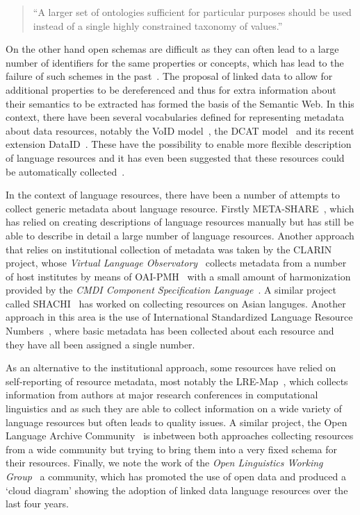 \documentclass[smallextended]{svjour3}       %
\begin{document}
\begin{quote}
``A larger set of ontologies sufficient for particular purposes should
be used instead of a single highly constrained taxonomy of values.''
\end{quote}

On the other hand open schemas are difficult
as they can often lead to a large number of identifiers for the same properties
or concepts, which has lead to the failure of such schemes in the
past~\cite{kemps2008isocat}. The proposal of linked data to allow for additional
properties to be dereferenced and thus for extra information about their
semantics to be extracted has formed the basis of the Semantic Web. In this
context, there have been several vocabularies defined for representing metadata
about data resources, notably the VoID model~\cite{alexander2011describing}, the
DCAT model~\cite{maali2014data} and its recent extension
DataID~\cite{brummer2014dataid}. These have the possibility to enable more
flexible description of language resources and it has even been suggested that
these resources could be automatically collected~\cite{jenkins1999automatic}.

In the context of language resources, there have been a number of attempts to
collect generic metadata about language resource. Firstly
META-SHARE~\cite{gavrilidou2012meta,piperidis2012meta}, which has relied on
creating descriptions of language resources manually but has still be able to
describe in detail a large number of language resources. Another approach that
relies on institutional collection of metadata was taken by the CLARIN project,
whose \emph{Virtual Language Observatory}~\cite{van2012semantic} collects
metadata from a number of host institutes by means of
OAI-PMH~\cite{sompel2004resource} with a small amount of harmonization provided
by the \emph{CMDI Component 
Specification Language}~\cite{broeder2012cmdi}. A similar project called
SHACHI~\cite{tohyama2008shachi} has worked on collecting resources on Asian
languges. Another approach in this area is the use of International Standardized
Language Resource Numbers~\cite[ISLRN]{choukri2012using}, where basic metadata
has been collected about each resource and they have all been assigned a single
number.

As an alternative to the institutional approach, some resources have relied on
self-reporting of resource metadata, most notably the
LRE-Map~\cite{calzolari2012lre}, which collects information from authors at
major research conferences in computational linguistics and as such they are
able to collect information on a wide variety of language resources but often
leads to quality issues. A similar project, the Open Language Archive
Community~\cite[OLAC]{piperidis2012meta} is inbetween both approaches collecting
resources from a wide community but trying to bring them into a very fixed
schema for their resources. Finally, we note the work of the \emph{Open
Linguistics Working Group}~\cite{chiarcos2012open} a community, which has
promoted the use of open data and produced a `cloud diagram' showing the
adoption of linked data language resources over the last four years.
\end{document}
